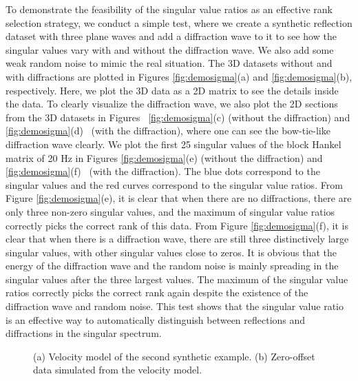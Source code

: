\documentclass[10pt]{IEEEtran}
\begin{document}
To demonstrate the feasibility of the singular value ratios as an effective rank selection strategy, we conduct a simple test, where we create a synthetic reflection dataset with three plane waves and add a diffraction wave to it to see how the singular values vary with and without the diffraction wave. We also add some weak random noise to mimic the real situation. The 3D datasets without and with diffractions are plotted in Figures \ref{fig:demosigma}(a) and \ref{fig:demosigma}(b), respectively. Here, we plot the 3D data as a 2D matrix to see the details inside the data. To clearly visualize the diffraction wave, we also plot the 2D sections from the 3D datasets in Figures  \ref{fig:demosigma}(c) (without the diffraction) and \ref{fig:demosigma}(d)  (with the diffraction), where one can see the bow-tie-like diffraction wave clearly. We plot the first 25 singular values of the block Hankel matrix of 20 Hz in Figures \ref{fig:demosigma}(e) (without the diffraction) and \ref{fig:demosigma}(f)  (with the diffraction). The blue dots correspond to the singular values and the red curves correspond to the singular value ratios. From Figure \ref{fig:demosigma}(e), it is clear that when there are no diffractions, there are only three non-zero singular values, and the maximum of singular value ratios correctly picks the correct rank of this data. From Figure \ref{fig:demosigma}(f), it is clear that when there is a diffraction wave, there are still three distinctively large singular values, with other singular values close to zeros. It is obvious that the energy of the diffraction wave and the random noise is mainly spreading in the singular values after the three largest values. The maximum of the singular value ratios correctly picks the correct rank again despite the existence of the diffraction wave and random noise. This test shows that the singular value ratio is an effective way to automatically distinguish between reflections and diffractions in the singular spectrum. 


\begin{figure}[htb!]
 \centering
\caption{(a) Velocity model of the second synthetic example. (b) Zero-offset data simulated from the velocity model.}
\label{fig:kvp,k}
\end{figure}
\end{document}
